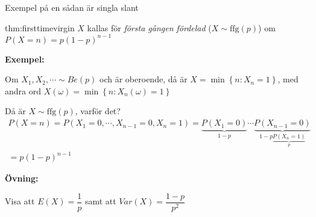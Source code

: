 \par\bigskip
\noindent Exempel på en sådan är singla slant
\par\bigskip
\begin{theo}{thm:firsttimevirgin}
  $X$ kallas för \textit{första gången fördelad} ($X\sim \text{ffg}(p)$) om $P(X=n) = p(1-p)^{n-1}$
\end{theo}
\par\bigskip
\noindent\textbf{Exempel:}\par
\noindent Om $X_1,X_2,\cdots\sim Be(p)$ och är oberoende, då är $X = \min\left\{n:X_n=1\right\}$, med andra ord $X(\omega) = \min\left\{n:X_n(\omega) = 1\right\}$ \par
\noindent Då är $X\sim\text{ffg}(p)$, varför det?
\begin{equation*}
  \begin{gathered}
    P(X=n) = P(X_1=0,\cdots,X_{n-1}=0, X_n=1) = \underbrace{P(X_1=0)}_{\text{$1-p$}}\cdots \underbrace{P(X_{n-1}=0)}_{\text{$1-p$}\underbrace{P(X_{n}=1)}_{\text{$p$}}}\\
    = p(1-p)^{n-1}
  \end{gathered}
\end{equation*}
\par\bigskip
\noindent\textbf{Övning:}\par
\noindent Visa att $E(X) =\dfrac{1}{p}$ samt att $Var(X) = \dfrac{1-p}{p^2}$
